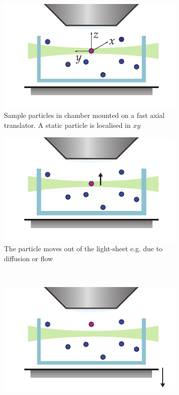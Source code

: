 \begin{figure}
	\centering
	\begin{subfigure}[t]{0.45\linewidth}
		\centering
		\includegraphics{Chapters/spt/Figs/PDF/tracking/1_piezo_track}
		\caption{Sample particles in chamber mounted on a fast axial translator. A static particle is localised in \(xy\)}\label{fig:SPIMSPT1}
	\end{subfigure}\quad
	\begin{subfigure}[t]{0.45\linewidth}
		\centering
		\includegraphics{Chapters/spt/Figs/PDF/tracking/2_piezo_track}
		\caption{The particle moves out of the light-sheet e.g. due to diffusion or flow}\label{fig:SPIMSPT2}
	\end{subfigure}
    \\\vspace{\abovecaptionskip}
	\begin{subfigure}[t]{0.45\linewidth}
		\centering
		\includegraphics{Chapters/spt/Figs/PDF/tracking/3_piezo_track}

\end{subfigure}
\end{figure}
